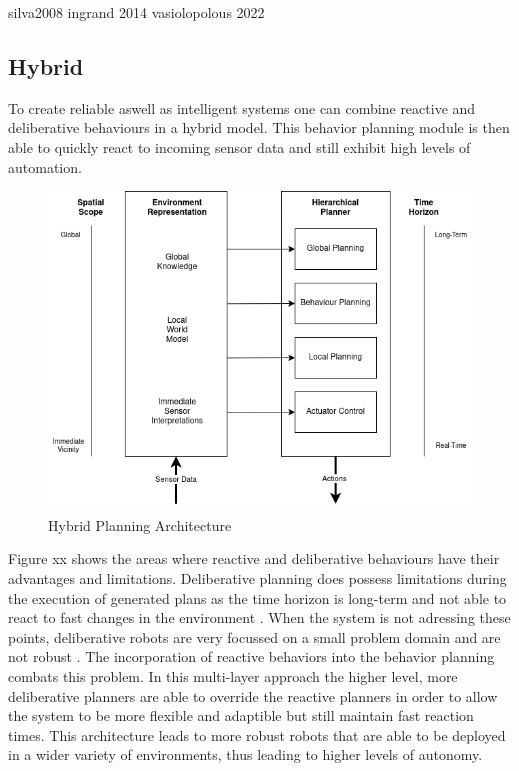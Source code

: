 silva2008
ingrand 2014
vasiolopolous 2022

\subsection{Hybrid}
To create reliable aswell as intelligent systems one can combine reactive and deliberative behaviours in a hybrid model. This behavior planning module is then able to quickly react to incoming sensor data and still exhibit high levels of automation. 
\\

\begin{figure}
	\includegraphics[width=1.0\textwidth]{images/Deliberative_hierarchical_planning.png} 
	\caption{Hybrid Planning Architecture \cite{arkin1998}  }
\end{figure}



Figure xx shows the areas where reactive and deliberative behaviours have their advantages and limitations. Deliberative planning does possess limitations during the execution of generated plans as the time horizon is long-term and not able to react to fast changes in the environment . When the system is not adressing these points, deliberative robots are very focussed on a small problem domain and are not robust \cite{arkin1998}.
The incorporation of reactive behaviors into the behavior planning combats this problem. In this multi-layer approach the higher level, more deliberative planners are able to override the reactive planners in order to allow the system to be more flexible and adaptible but still maintain fast reaction times. 
This architecture leads to more robust robots that are able to be deployed in a wider variety of environments, thus leading to higher levels of autonomy.


